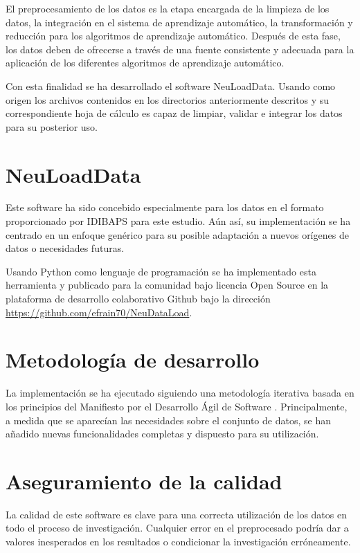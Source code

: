 El preprocesamiento de los datos es la etapa encargada de la limpieza de los datos, la integración en el sistema de aprendizaje automático, la transformación y reducción para los algoritmos de aprendizaje automático. Después de esta fase, los datos deben de ofrecerse a través de una fuente consistente y adecuada para la aplicación de los diferentes algoritmos de aprendizaje automático.

Con esta finalidad se ha desarrollado el software NeuLoadData. Usando como origen los archivos contenidos en los directorios anteriormente descritos y su correspondiente hoja de cálculo es capaz de limpiar, validar e integrar los datos para su posterior uso.

\section{NeuLoadData}
Este software ha sido concebido especialmente para los datos en el formato proporcionado por IDIBAPS para este estudio. Aún así, su implementación se ha centrado en un enfoque genérico para su posible adaptación a nuevos orígenes de datos o necesidades futuras.

Usando Python como lenguaje de programación se ha implementado esta herramienta y publicado para la comunidad bajo licencia Open Source en la plataforma de desarrollo colaborativo Github \cite{WhatGitHub} bajo la dirección \url{https://github.com/efrain70/NeuDataLoad}.

\section{Metodología de desarrollo}

La implementación se ha ejecutado siguiendo una metodología iterativa basada en los principios del Manifiesto por el Desarrollo Ágil de Software \cite{ManifiestoSoftware}. Principalmente, a medida que se aparecían las necesidades sobre el conjunto de datos, se han añadido nuevas funcionalidades completas y dispuesto para su utilización.

\section{Aseguramiento de la calidad}
La calidad de este software es clave para una correcta utilización de los datos en todo el proceso de investigación. Cualquier error en el preprocesado podría dar a valores inesperados en los resultados o condicionar la investigación erróneamente.

